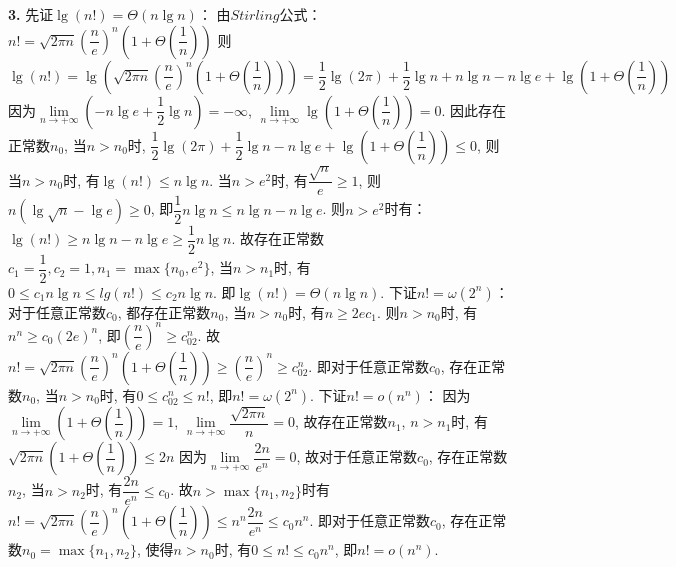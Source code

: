 \documentclass[UTF8]{ctexart}
\begin{document}
	\begin{solution}\textnormal{\textbf{3.}}
		先证$\lg(n!) = \Theta(n\lg n)$：\newline
		由$Stirling$公式：$n! = \sqrt{2\pi n}\left(\dfrac{n}{e}\right)^n\left(1 + \Theta\left(\dfrac{1}{n}\right)\right)$\newline
		则$\lg(n!) = \lg\left(\sqrt{2\pi n}\left(\dfrac{n}{e}\right)^n\left(1 + \Theta\left(\dfrac{1}{n}\right)\right)\right) = \dfrac{1}{2}\lg(2\pi) + \dfrac{1}{2}\lg n + n\lg n - n\lg e + \lg\left(1 + \Theta\left(\dfrac{1}{n}\right)\right)$\newline
		因为$\lim\limits_{n \to +\infty}\left(-n\lg e + \dfrac{1}{2}\lg n\right) = -\infty$, $\lim\limits_{n \to +\infty}\lg \left(1 + \Theta\left(\dfrac{1}{n}\right)\right) = 0$.\newline
		因此存在正常数$n_0$, 当$n > n_0$时, $\dfrac{1}{2}\lg(2\pi) + \dfrac{1}{2}\lg n - n\lg e + \lg\left(1 + \Theta\left(\dfrac{1}{n}\right)\right) \leq 0$,\newline
		则当$n > n_0$时, 有$\lg(n!) \leq n\lg n$.\newline
		当$n > e^2$时, 有$\dfrac{\sqrt{n}}{e} \geq 1$, 则$n\left(\lg \sqrt{n} - \lg e\right) \geq 0$, 即$\dfrac{1}{2}n\lg n \leq n\lg n - n\lg e$.\newline
		则$n > e^2$时有：$\lg(n!) \geq n\lg n - n \lg e \geq \dfrac{1}{2}n\lg n$.\newline
		故存在正常数$c_1 = \dfrac{1}{2}, c_2 = 1, n_1 = \max\{n_0, e^2\}$, 当$n > n_1$时, 有$0 \leq c_1n\lg n \leq lg(n!) \leq c_2n\lg n$.\newline
		即$\lg(n!) = \Theta(n\lg n)$.\newline
		下证$n! = \omega(2^n)$：\newline
		对于任意正常数$c_0$, 都存在正常数$n_0$, 当$n > n_0$时, 有$n \geq 2ec_1$. 则$n > n_0$时, 有$n^n \geq c_0(2e)^n$, 即$\left(\dfrac{n}{e}\right)^n \geq c_02^n$.\newline
		故$n! = \sqrt{2\pi n}\left(\dfrac{n}{e}\right)^n\left(1 + \Theta\left(\dfrac{1}{n}\right)\right) \geq \left(\dfrac{n}{e}\right)^n \geq c_02^n$.\newline
		即对于任意正常数$c_0$, 存在正常数$n_0$, 当$n > n_0$时, 有$0 \leq c_02^n \leq n!$, 即$n! = \omega(2^n)$.\newline
		下证$n! = o(n^n)$：\newline
		因为$\lim\limits_{n \to +\infty}\left(1 + \Theta\left(\dfrac{1}{n}\right)\right) = 1$, $\lim\limits_{n \to +\infty}\dfrac{\sqrt{2\pi n}}{n} = 0$, 故存在正常数$n_1$, $n > n_1$时, 有$\sqrt{2\pi n}\left(1 + \Theta\left(\dfrac{1}{n}\right)\right) \leq 2n$\newline
		因为$\lim\limits_{n \to +\infty}\dfrac{2n}{e^n} = 0$, 故对于任意正常数$c_0$, 存在正常数$n_2$, 当$n > n_2$时, 有$\dfrac{2n}{e^n} \leq c_0$.\newline
		故$n > \max\{n_1, n_2\}$时有$n! = \sqrt{2\pi n}\left(\dfrac{n}{e}\right)^n\left(1 + \Theta\left(\dfrac{1}{n}\right)\right) \leq n^n\dfrac{2n}{e^n} \leq c_0n^n$.\newline
		即对于任意正常数$c_0$, 存在正常数$n_0 = \max\{n_1, n_2\}$, 使得$n > n_0$时, 有$0 \leq n! \leq c_0n^n$, 即$n! = o(n^n)$.
	\end{solution}
\end{document}
